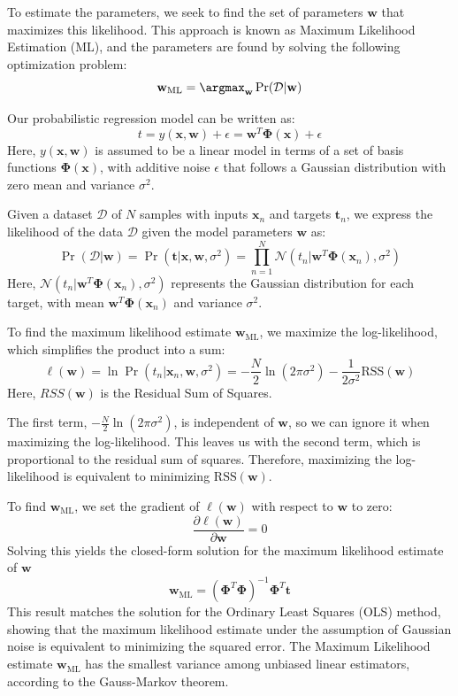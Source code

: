 To estimate the parameters, we seek to find the set of parameters $\mathbf{w}$ that maximizes this likelihood.
This approach is known as Maximum Likelihood Estimation (ML), and the parameters are found by solving the following optimization problem:
\[\mathbf{w}_{\text{ML}}=\argmax_{\mathbf{w}}\Pr(\mathcal{D}|\mathbf{w})\]

Our probabilistic regression model can be written as:
\[t=y(\mathbf{x},\mathbf{w})+\epsilon=\mathbf{w}^T\boldsymbol{\Phi}(\mathbf{x})+\epsilon\]
Here, $y(\mathbf{x},\mathbf{w})$ is assumed to be a linear model in terms of a set of basis functions $\boldsymbol{\Phi}(\mathbf{x})$, with additive noise $\epsilon$ that follows a Gaussian distribution with zero mean and variance $\sigma^2$. 

Given a dataset $\mathcal{D}$ of $N$ samples with inputs $\mathbf{x}_n$ and targets $\mathbf{t}_n$, we express the likelihood of the data $\mathcal{D}$ given the model parameters $\mathbf{w}$ as: 
\[\Pr(\mathcal{D}|\mathbf{w})=\Pr(\mathbf{t}|\mathbf{x},\mathbf{w},\sigma^2)=\prod_{n=1}^{N}\mathcal{N}(t_n|\mathbf{w}^T\boldsymbol{\Phi}(\mathbf{x}_n),\sigma^2)\]
Here, $\mathcal{N}(t_n|\mathbf{w}^T\boldsymbol{\Phi}(\mathbf{x}_n),\sigma^2)$ represents the Gaussian distribution for each target, with mean $\mathbf{w}^T\boldsymbol{\Phi}(\mathbf{x}_n)$ and variance $\sigma^2$. 

To find the maximum likelihood estimate $\mathbf{w}_{\text{ML}}$, we maximize the log-likelihood, which simplifies the product into a sum:
\[\ell (\mathbf{w})=\ln\Pr(t_n|\mathbf{x}_n, \mathbf{w} ,\sigma^2)=-\dfrac{N}{2}\ln(2\pi\sigma^2)-\dfrac{1}{2\sigma^2}\text{RSS}(\mathbf{w})\]
Here, $RSS(\mathbf{w})$ is the Residual Sum of Squares.

The first term, $-\frac{N}{2}\ln(2\pi\sigma^2)$, is independent of $\mathbf{w}$, so we can ignore it when maximizing the log-likelihood.
This leaves us with the second term, which is proportional to the residual sum of squares. 
Therefore, maximizing the log-likelihood is equivalent to minimizing $\text{RSS}(\mathbf{w})$. 

To find $\mathbf{w}_{\text{ML}}$, we set the gradient of $\ell (\mathbf{w})$ with respect to $\mathbf{w}$ to zero: 
\[\dfrac{\partial \ell (\mathbf{w})}{\partial\mathbf{w}}=0\]
Solving this yields the closed-form solution for the maximum likelihood estimate of $\mathbf{w}$
\[\mathbf{w}_{\text{ML}}={\left( \boldsymbol{\Phi}^T\boldsymbol{\Phi} \right)}^{-1}\boldsymbol{\Phi}^T\mathbf{t}\]
This result matches the solution for the Ordinary Least Squares (OLS) method, showing that the maximum likelihood estimate under the assumption of Gaussian noise is equivalent to minimizing the squared error.
The Maximum Likelihood estimate $\mathbf{w}_{\text{ML}}$ has the smallest variance among unbiased linear estimators, according to the Gauss-Markov theorem.

